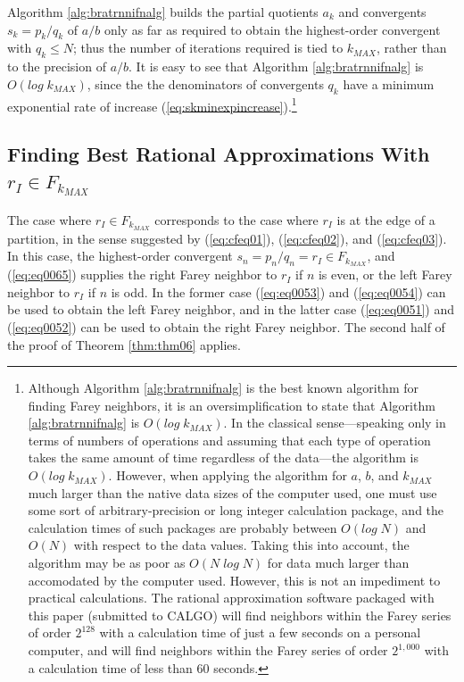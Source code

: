 \documentclass{esub2acm}
\begin{document}
Algorithm \ref{alg:bratrnnifnalg} builds the partial quotients $a_k$ and convergents
$s_k = p_k/q_k$ of $a/b$ only as far as required to obtain the highest-order
convergent with $q_k \leq N$; thus the number of iterations required is tied to
$k_{MAX}$, rather than to the precision of $a/b$.  It is easy to see that
Algorithm \ref{alg:bratrnnifnalg} is $O(log \; k_{MAX})$, since the the denominators
of convergents $q_k$ have a minimum exponential rate of increase
(\ref{eq:skminexpincrease}).\footnote{Although Algorithm \ref{alg:bratrnnifnalg}
is the best known algorithm for finding Farey neighbors, it is an oversimplification
to state that Algorithm \ref{alg:bratrnnifnalg} is $O(log \; k_{MAX})$.  In the
classical sense---speaking only in terms of numbers of operations and assuming that each type of
operation takes the same amount of time regardless of the data---the algorithm
is $O(log \; k_{MAX})$.  However, when applying the algorithm for $a$, $b$, and $k_{MAX}$
much larger than the native data sizes of the computer used, one must use some sort
of arbitrary-precision or long integer calculation package, and the calculation times
of such packages are probably between $O(log \; N)$ and $O(N)$ with respect to the data values.
Taking this into account, the algorithm may be as poor as $O(N \; log \; N)$ for data much larger than
accomodated by the computer used.  However, this is not an impediment to practical calculations.
The rational approximation software packaged with this paper (submitted to CALGO) will find
neighbors
within the Farey series of order $2^{128}$ with a calculation time of just a few seconds
on a personal computer, and will find neighbors within the Farey series of order $2^{1,000}$ with a
calculation time
of less than 60 seconds.}

\subsection{Finding Best Rational Approximations With $r_I \in F_{k_{MAX}}$}

The case where $r_I \in F_{k_{MAX}}$ corresponds to the case where $r_I$ is at the
edge of a partition, in the sense suggested by (\ref{eq:cfeq01}),
(\ref{eq:cfeq02}), and (\ref{eq:cfeq03}).  In this case, the
highest-order convergent
$s_n = p_n/q_n = r_I \in F_{k_{MAX}}$, and (\ref{eq:eq0065})
supplies the right Farey neighbor to
$r_I$ if $n$ is even, or the left Farey neighbor to $r_I$ if $n$ is odd.
In the former case (\ref{eq:eq0053}) and (\ref{eq:eq0054}) can be used
to obtain the left Farey neighbor, and in the latter case
(\ref{eq:eq0051}) and (\ref{eq:eq0052}) can be used to obtain
the right Farey neighbor.  The second half of the proof
of Theorem \ref{thm:thm06} applies.
\end{document}
